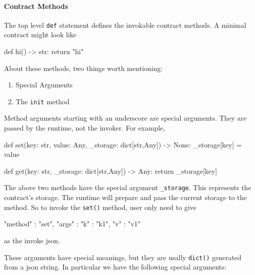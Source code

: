 \paragraph{Contract Methods}

The top level \texttt{def} statement defines the invokable contract methods. A
minimal contract might look like
\begin{simplepy}
def hi() -> str:
    return "hi"
\end{simplepy}

About these methods, two things worth mentioning:
\begin{enumerate}
\item Special Arguments
\item The \texttt{init} method
\end{enumerate}

Method arguments starting with an underscore are special arguments. They are
passed by the runtime, not the invoker. For example,
\begin{simplepy}
def set(key: str, value: Any, _storage: dict[str,Any]) -> None:
    _storage[key] = value

def get(key: str, _storage: dict[str,Any]) -> Any:
    return _storage[key]
\end{simplepy}

The above two methods have the special argument \texttt{\_storage}. This
represents the contract's storage. The runtime will prepare and pass the current
storage to the method. So to invoke the \texttt{set()} method, user only need to
give
\begin{simplejs}
{
    "method" : "set",
    "args" : {
        "k" : "k1",
        "v" : "v1"
    }
}
\end{simplejs}
as the invoke json.

These arguments have special meanings, but they are usally \texttt{dict()}
generated from a json string. In particular we have the following special
arguments:

